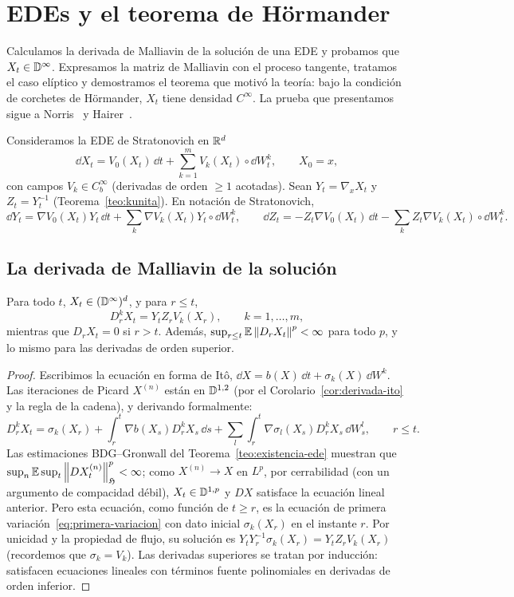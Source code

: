 \chapter{EDEs y el teorema de Hörmander}\label{cap:hormander}

\begin{panorama}
Calculamos la derivada de Malliavin de la solución de una EDE y probamos que $X_t\in\mathbb{D}^\infty$.
Expresamos la matriz de Malliavin con el proceso tangente, tratamos el caso elíptico
y demostramos el teorema que motivó la teoría: bajo la condición de corchetes de
Hörmander, $X_t$ tiene densidad $C^\infty$. La prueba que presentamos sigue a Norris~\cite{Norris86} y
Hairer~\cite{Hairer11}.
\end{panorama}

Consideramos la EDE de Stratonovich en $\mathbb{R}^d$
\begin{equation}\label{eq:ede-strat}
  \dd X_t=V_0(X_t)\,\dd t+\sum_{k=1}^mV_k(X_t)\circ\dd W^k_t,\qquad X_0=x,
\end{equation}
con campos $V_k\in C_b^\infty$ (derivadas de orden $\ge1$ acotadas). Sean $Y_t=\nabla_xX_t$ y $Z_t=Y_t^{-1}$
(Teorema~\ref{teo:kunita}). En notación de Stratonovich,
\[
  \dd Y_t=\nabla V_0(X_t)Y_t\,\dd t+\sum_k\nabla V_k(X_t)Y_t\circ\dd W^k_t,\qquad\dd Z_t=-Z_t\nabla V_0(X_t)\,\dd t-\sum_kZ_t\nabla V_k(X_t)\circ\dd W^k_t.
\]

\section{La derivada de Malliavin de la solución}

\begin{teorema}\label{teo:derivada-ede}
Para todo $t$, $X_t\in(\mathbb{D}^\infty)^d$, y para $r\le t$,
\[
  D^k_rX_t=Y_tZ_rV_k(X_r),\qquad k=1,\dots,m,
\]
mientras que $D_rX_t=0$ si $r>t$. Además, $\sup_{r\le t}\mathbb{E}\left\lVert D_rX_t\right\rVert^p<\infty$ para todo $p$, y lo mismo
para las derivadas de orden superior.
\end{teorema}

\begin{proof}
Escribimos la ecuación en forma de Itô, $\dd X=b(X)\,\dd t+\sigma_k(X)\,\dd W^k$. Las
iteraciones de Picard $X^{(n)}$ están en $\mathbb{D}^{1,2}$ (por el Corolario~\ref{cor:derivada-ito} y la regla de la cadena), y
derivando formalmente:
\[
  D^k_rX_t=\sigma_k(X_r)+\int_r^t\nabla b(X_s)D^k_rX_s\,\dd s+\sum_l\int_r^t\nabla\sigma_l(X_s)D^k_rX_s\,\dd W^l_s,\qquad r\le t.
\]
Las estimaciones BDG--Gronwall del Teorema~\ref{teo:existencia-ede} muestran que $\sup_n\mathbb{E}\sup_t\left\lVert DX^{(n)}_t\right\rVert^p_{\mathfrak{H}}<\infty$;
como $X^{(n)}\to X$ en $L^p$, por cerrabilidad (con un argumento de compacidad débil), $X_t\in\mathbb{D}^{1,p}$
y $DX$ satisface la ecuación lineal anterior. Pero esta ecuación, como función de $t\ge r$, es la
ecuación de primera variación~\eqref{eq:primera-variacion} con dato inicial $\sigma_k(X_r)$ en el instante $r$. Por unicidad y la
propiedad de flujo, su solución es $Y_tY_r^{-1}\sigma_k(X_r)=Y_tZ_rV_k(X_r)$ (recordemos que $\sigma_k=V_k$). Las
derivadas superiores se tratan por inducción: satisfacen ecuaciones lineales con términos fuente
polinomiales en derivadas de orden inferior.
\end{proof}

